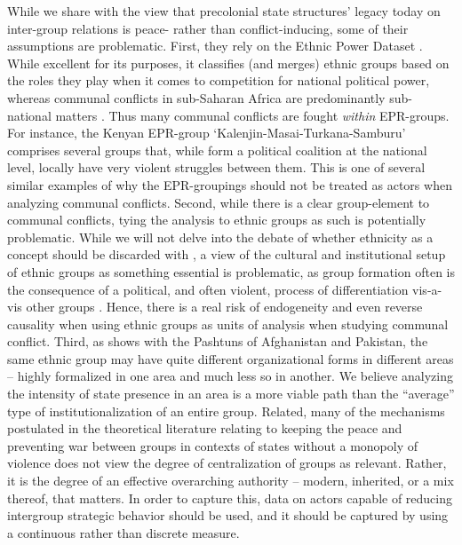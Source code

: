 While we share with \citet{Wig2018} the view that precolonial state structures'
legacy today on inter-group relations is peace- rather than conflict-inducing,
some of their assumptions are problematic. First, they rely on the Ethnic Power
Dataset \citep{Cederman2010}. While excellent for its purposes, it classifies
(and merges) ethnic groups based on the roles they play when it comes to
competition for national political power, whereas communal conflicts in
sub-Saharan Africa are predominantly sub-national matters
\citep{Hillesund_2017}. Thus many communal conflicts are fought \textit{within}
EPR-groups. For instance, the Kenyan EPR-group `Kalenjin-Masai-Turkana-Samburu'
comprises several groups that, while form a political coalition at the national
level, locally have very violent struggles between them. This is one of several
similar examples of why the EPR-groupings should not be treated as actors when
analyzing communal conflicts. Second, while there is a clear group-element to
communal conflicts, tying the analysis to ethnic groups as such is potentially
problematic. While we will not delve into the debate of whether ethnicity as a
concept should be discarded with \citep{Chandra2006}, a view of the cultural and
institutional setup of ethnic groups as something essential is problematic, as
group formation often is the consequence of a political, and often violent,
process of differentiation vis-a-vis other groups \citep[15]{barth1969,
GraeberDavid2021TDoE}.  Hence, there is a real risk of endogeneity and even
reverse causality when using ethnic groups as units of analysis when studying
communal conflict. Third, as \citet[12f]{barth1969} shows with the Pashtuns of
Afghanistan and Pakistan, the same ethnic group may have quite different
organizational forms in different areas -- highly formalized in one area and
much less so in another. We believe analyzing the intensity of state presence in
an area is a more viable path than the ``average'' type of institutionalization of
an entire group. Related, many of the mechanisms postulated in the theoretical
literature relating to keeping the peace and preventing war between groups in
contexts of states without a monopoly of violence does not view the degree of
centralization of groups as relevant. Rather, it is the degree of an effective
overarching authority -- modern, inherited, or a mix thereof, that matters.  In
order to capture this, data on actors capable of reducing intergroup strategic
behavior should be used, and it should be captured by using a continuous rather
than discrete measure.

